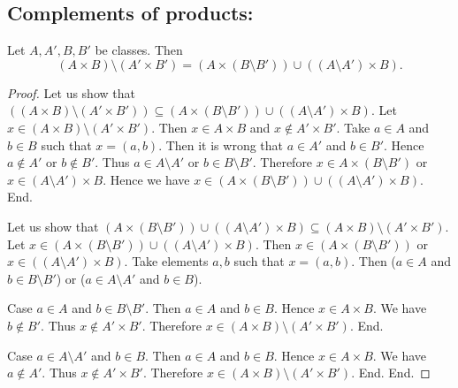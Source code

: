\documentclass[../set-theory.tex]{subfiles}
\begin{document}
  \subsection*{Complements of products:}

  \begin{forthel}
    \begin{proposition}\label{SET_THEORY_05_5552125989879808}
      Let $A, A', B, B'$ be classes.
      Then \[ (A \times B) \setminus (A' \times B') =
      (A \times (B \setminus B')) \cup ((A \setminus A') \times B). \]
    \end{proposition}
    \begin{proof}
      Let us show that $((A \times B) \setminus (A' \times B')) \subseteq (A \times (B \setminus B')) \cup ((A \setminus A') \times B)$.
        Let $x \in (A \times B) \setminus (A' \times B')$.
        Then $x \in A \times B$ and $x \notin A' \times B'$.
        Take $a \in A$ and $b \in B$ such that $x = (a, b)$.
        Then it is wrong that $a \in A'$ and $b \in B'$.
        Hence $a \notin A'$ or $b \notin B'$.
        Thus $a \in A \setminus A'$ or $b \in B \setminus B'$.
        Therefore $x \in A \times (B \setminus B')$ or $x \in (A \setminus A') \times B$.
        Hence we have $x \in (A \times (B \setminus B')) \cup ((A \setminus A') \times B)$.
      End.

      Let us show that $(A \times (B \setminus B')) \cup ((A \setminus A') \times B) \subseteq (A \times B) \setminus (A' \times B')$.
        Let $x \in (A \times (B \setminus B')) \cup ((A \setminus A') \times B)$.
        Then $x \in (A \times (B \setminus B'))$ or $x \in ((A \setminus A') \times B)$.
        Take elements $a,b$ such that $x = (a, b)$.
        Then ($a \in A$ and $b \in B \setminus B'$) or ($a \in A \setminus A'$ and $b \in B$).

        Case $a \in A$ and $b \in B \setminus B'$.
          Then $a \in A$ and $b \in B$.
          Hence $x \in A \times B$.
          We have $b \notin B'$.
          Thus $x \notin A' \times B'$.
          Therefore $x \in (A \times B) \setminus (A' \times B')$.
        End.

        Case $a \in A \setminus A'$ and $b \in B$.
          Then $a \in A$ and $b \in B$.
          Hence $x \in A \times B$.
          We have $a \notin A'$.
          Thus $x \notin A' \times B'$.
          Therefore $x \in (A \times B) \setminus (A' \times B')$.
        End.
      End.
    \end{proof}
  \end{forthel}
\end{document}
